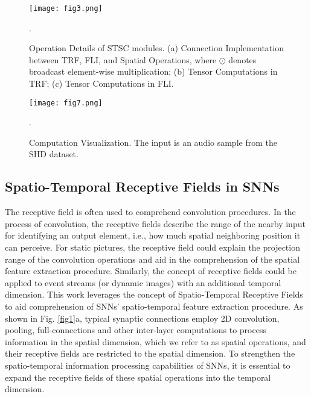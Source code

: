 \documentclass[letterpaper]{article} \usepackage[submission]{aaai23}  \usepackage{times}  \usepackage{helvet}  \usepackage{courier}  \usepackage[hyphens]{url}  \usepackage{graphicx} \urlstyle{rm} \def\UrlFont{\rm}  \usepackage{natbib}  \usepackage{caption} \frenchspacing  \setlength{\pdfpagewidth}{8.5in} \setlength{\pdfpageheight}{11in} \usepackage{algorithm}
\begin{document}
\begin{figure}[t]
\centering
\texttt{[image: fig3.png]} 
\caption{Operation Details of STSC modules. (a) Connection Implementation between TRF, FLI, and Spatial Operations, where $\odot$ denotes broadcast element-wise multiplication; (b) Tensor Computations in TRF; (c) Tensor Computations in FLI. 
}.
\label{fig3}
\end{figure}


\begin{figure}[t]
\centering
\texttt{[image: fig7.png]} 
\caption{Computation Visualization. The input is an audio sample from the SHD dataset.
}.
\label{fig7}
\end{figure}

\subsection{Spatio-Temporal Receptive Fields in SNNs}
The receptive field is often used to comprehend convolution procedures. In the process of convolution, the receptive fields describe the range of the nearby input for identifying an output element, i.e., how much spatial neighboring position it can perceive.
For static pictures, the receptive field could explain the projection range of the convolution operations and aid in the comprehension of the spatial feature extraction procedure. 
Similarly, the concept of receptive fields could be applied to event streams (or dynamic images) with an additional temporal dimension.
This work leverages the concept of Spatio-Temporal Receptive Fields to aid comprehension of SNNs' spatio-temporal feature extraction procedure. 
As shown in Fig. \ref{fig1}a,  typical synaptic connections employ 2D convolution, pooling, full-connections and other inter-layer computations to process information in the spatial dimension, which we refer to as spatial operations, and their receptive fields are restricted to the spatial dimension.
To strengthen the spatio-temporal information processing capabilities of SNNs, it is essential to expand the receptive fields of these spatial operations into the temporal dimension.
\end{document}
